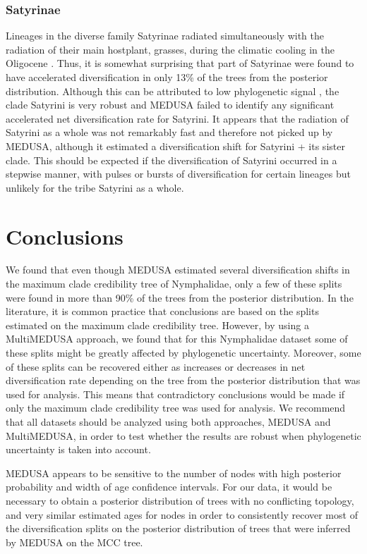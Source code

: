 \documentclass[10pt]{article}
\begin{document}
\subsubsection*{Satyrinae}

Lineages in the diverse family Satyrinae radiated simultaneously with the
radiation of
their main hostplant, grasses, during the climatic cooling in the
Oligocene \cite{pena2008}. Thus, it is somewhat surprising that part of
Satyrinae were
found to have accelerated diversification in only 13\% of the trees from
the posterior distribution. Although this can be attributed to low
phylogenetic signal \cite{wahlberg2009}, the clade Satyrini is very robust
\cite{wahlberg2009}
and MEDUSA failed to identify any significant accelerated net
diversification rate for Satyrini. It appears that the radiation of
Satyrini as a whole was not remarkably fast and therefore not picked up
by MEDUSA, although it estimated a diversification shift for Satyrini + its
sister clade. This should be expected if the diversification of Satyrini
occurred in a stepwise manner, with pulses or bursts of diversification
for certain lineages but unlikely for the tribe Satyrini as a whole.

\section*{Conclusions}
We found that even though MEDUSA estimated several diversification
shifts in the maximum clade credibility tree of Nymphalidae, only a few
of these splits were found in more than 90\% of the trees from the
posterior distribution. In the literature, it is common practice that
conclusions are based on the splits estimated on the maximum clade
credibility tree. However, by using a MultiMEDUSA approach, we found
that for this Nymphalidae dataset some of these splits might be greatly
affected by phylogenetic uncertainty. Moreover, some of these splits can
be recovered either as increases or decreases in net diversification
rate depending on the tree from the posterior distribution that was used
for analysis. This means that contradictory conclusions would be made if
only the maximum clade credibility tree was used for analysis. We
recommend that all datasets should be analyzed using both approaches,
MEDUSA and MultiMEDUSA, in order to test whether the results are robust
when phylogenetic uncertainty is taken into account.

MEDUSA appears to be sensitive to the number of nodes with high
posterior probability and width of age confidence intervals. For our
data, it would be necessary to obtain a posterior distribution of trees
with no conflicting topology, and very similar estimated ages for nodes
in order to consistently recover most of the diversification splits on
the posterior distribution of trees that were inferred by MEDUSA on the
MCC tree.
\end{document}
